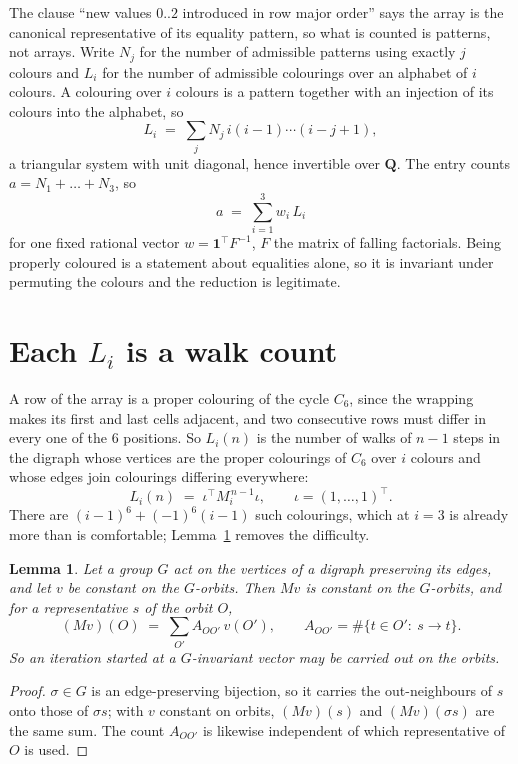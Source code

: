 \documentclass[11pt,a4paper]{article}
\theoremstyle{plain}
\newtheorem{lemma}[theorem]{Lemma}
\theoremstyle{definition}
\begin{document}
The clause ``new values $0..2$ introduced in row major order'' says the array is the
canonical representative of its equality pattern, so what is counted is patterns, not arrays.
Write $N_j$ for the number of admissible patterns using exactly $j$ colours and $L_i$ for the
number of admissible colourings over an alphabet of $i$ colours. A colouring over $i$ colours
is a pattern together with an injection of its colours into the alphabet, so
\[
L_i\;=\;\sum_j N_j\,i(i-1)\cdots(i-j+1),
\]
a triangular system with unit diagonal, hence invertible over $\mathbf{Q}$. The entry counts
$a=N_1+\dots+N_{3}$, so
\[
a\;=\;\sum_{i=1}^{3}w_i\,L_i
\]
for one fixed rational vector $w=\mathbf{1}^{\!\top}F^{-1}$, $F$ the matrix of falling
factorials. Being properly coloured is a statement about equalities alone, so it is invariant
under permuting the colours and the reduction is legitimate.

\section{Each $L_i$ is a walk count}

A row of the array is a proper colouring of the cycle $C_{6}$, since the wrapping makes
its first and last cells adjacent, and two consecutive rows must differ in every one of the
$6$ positions. So $L_i(n)$ is the number of walks of $n-1$ steps in the digraph whose
vertices are the proper colourings of $C_{6}$ over $i$ colours and whose edges join
colourings differing everywhere:
\[
L_i(n)\;=\;\iota^{\!\top}M_i^{\,n-1}\iota ,\qquad \iota=(1,\dots,1)^{\!\top} .
\]
There are $(i-1)^{6}+(-1)^{6}(i-1)$ such colourings, which at $i=3$ is already more
than is comfortable; Lemma~\ref{lem:lump} removes the difficulty.

\begin{lemma}\label{lem:lump}
Let a group $G$ act on the vertices of a digraph preserving its edges, and let $v$ be constant
on the $G$-orbits. Then $Mv$ is constant on the $G$-orbits, and for a representative $s$ of
the orbit $O$,
\[
(Mv)(O)\;=\;\sum_{O'}A_{OO'}\,v(O'),\qquad
A_{OO'}=\#\{t\in O':\ s\to t\} .
\]
So an iteration started at a $G$-invariant vector may be carried out on the orbits.
\end{lemma}

\begin{proof}
$\sigma\in G$ is an edge-preserving bijection, so it carries the out-neighbours of $s$ onto
those of $\sigma s$; with $v$ constant on orbits, $(Mv)(s)$ and $(Mv)(\sigma s)$ are the same
sum. The count $A_{OO'}$ is likewise independent of which representative of $O$ is used.
\end{proof}
\end{document}
